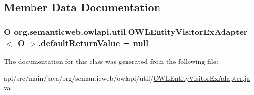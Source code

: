 \subsection{Member Data Documentation}
\hypertarget{classorg_1_1semanticweb_1_1owlapi_1_1util_1_1_o_w_l_entity_visitor_ex_adapter_3_01_o_01_4_ab6f951a9b5122724746424fe40365584}{
\subsubsection[{default\-Return\-Value}]{\setlength{\rightskip}{0pt plus 5cm}O org.\-semanticweb.\-owlapi.\-util.\-O\-W\-L\-Entity\-Visitor\-Ex\-Adapter$<$ O $>$.default\-Return\-Value = null\hspace{0.3cm}{\ttfamily [private]}}}\label{classorg_1_1semanticweb_1_1owlapi_1_1util_1_1_o_w_l_entity_visitor_ex_adapter_3_01_o_01_4_ab6f951a9b5122724746424fe40365584}


The documentation for this class was generated from the following file\-:\begin{DoxyCompactItemize}
\item 
api/src/main/java/org/semanticweb/owlapi/util/\hyperlink{_o_w_l_entity_visitor_ex_adapter_8java}{O\-W\-L\-Entity\-Visitor\-Ex\-Adapter.\-java}\end{DoxyCompactItemize}
